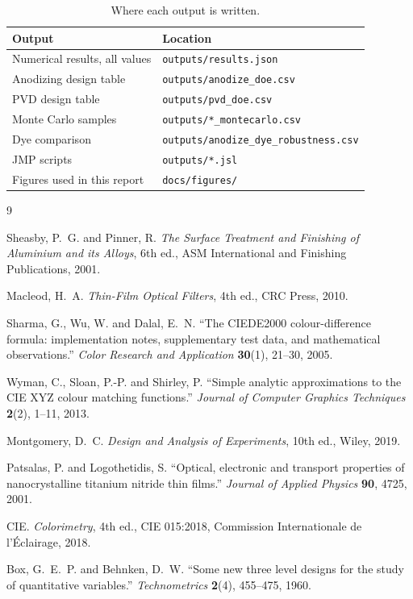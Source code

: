 \documentclass[11pt,a4paper]{article}
\begin{document}
\begin{table}[htbp]
\centering
\small
\begin{tabular}{@{}ll@{}}
\toprule
\textbf{Output} & \textbf{Location} \\
\midrule
Numerical results, all values & \texttt{outputs/results.json} \\
Anodizing design table        & \texttt{outputs/anodize\_doe.csv} \\
PVD design table              & \texttt{outputs/pvd\_doe.csv} \\
Monte Carlo samples           & \texttt{outputs/*\_montecarlo.csv} \\
Dye comparison                & \texttt{outputs/anodize\_dye\_robustness.csv} \\
JMP scripts                   & \texttt{outputs/*.jsl} \\
Figures used in this report   & \texttt{docs/figures/} \\
\bottomrule
\end{tabular}
\caption{Where each output is written.}
\end{table}

\begin{thebibliography}{9}
\small

 Sheasby, P.~G. and Pinner, R.
\emph{The Surface Treatment and Finishing of Aluminium and its Alloys},
6th ed., ASM International and Finishing Publications, 2001.

 Macleod, H.~A.
\emph{Thin-Film Optical Filters}, 4th ed., CRC Press, 2010.

 Sharma, G., Wu, W. and Dalal, E.~N.
``The CIEDE2000 colour-difference formula: implementation notes, supplementary
test data, and mathematical observations.''
\emph{Color Research and Application} \textbf{30}(1), 21--30, 2005.

 Wyman, C., Sloan, P.-P. and Shirley, P.
``Simple analytic approximations to the CIE XYZ colour matching functions.''
\emph{Journal of Computer Graphics Techniques} \textbf{2}(2), 1--11, 2013.

 Montgomery, D.~C.
\emph{Design and Analysis of Experiments}, 10th ed., Wiley, 2019.

 Patsalas, P. and Logothetidis, S.
``Optical, electronic and transport properties of nanocrystalline titanium
nitride thin films.''
\emph{Journal of Applied Physics} \textbf{90}, 4725, 2001.

 CIE.
\emph{Colorimetry}, 4th ed., CIE 015:2018, Commission Internationale de
l'\'Eclairage, 2018.

 Box, G.~E.~P. and Behnken, D.~W.
``Some new three level designs for the study of quantitative variables.''
\emph{Technometrics} \textbf{2}(4), 455--475, 1960.

\end{thebibliography}
\end{document}

